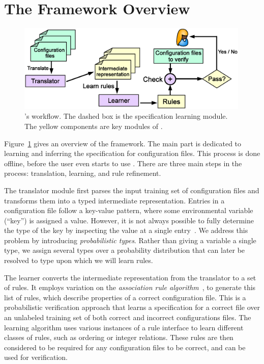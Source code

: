 
\section{The \app Framework Overview}

\begin{figure}[tbp] \centering
\includegraphics[width=0.99\textwidth]{figs/overview}
\caption{\app's workflow.
  The dashed box is the specification learning module. 
  The yellow components are key modules of \app.}
\label{fig-overview}
\end{figure}

Figure~\ref{fig-overview} gives an overview of the \app framework.
The main part is dedicated to 
learning and inferring the specification for configuration 
files. This process is done offline, before the user even starts 
to use \app. There are three main steps in the process:
translation, learning, and rule refinement.

The translator module first parses the input training  
set of configuration files and transforms them into 
a typed intermediate representation.
Entries in a configuration file follow a key-value pattern, 
where some environmental variable (``key'') is assigned a value.
However, it is not always possible to fully determine the type of the key
by inspecting the value at a single entry~\cite{xu15hey}.
We address this problem 
by introducing {\em probabilistic types}.
Rather than giving a variable a single type, 
we assign several types over a probability distribution that can later be resolved to type upon which we will learn rules.

The learner converts the intermediate representation from the translator to a set of rules.
It employs variation on the {\em association rule 
algorithm}~\cite{agrawal1993mining}, to generate this list of rules, which describe properties of a correct configuration file. 
This is a probabilistic verification approach that learns a specification for a correct file over an unlabeled training set of both correct and incorrect configurations files.
The learning algorithm uses various instances of a rule interface to learn different classes of rules, such as ordering or integer relations.
These rules are then considered to be required for any configuration files to be correct, and can be used for verification.

